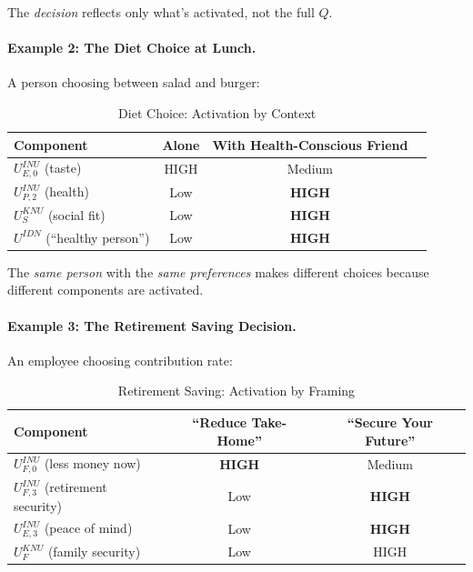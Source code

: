 The \emph{decision} reflects only what's activated, not the full $Q$.

\paragraph{Example 2: The Diet Choice at Lunch.}
A person choosing between salad and burger:

\begin{table}[htbp]
\centering
\caption{Diet Choice: Activation by Context}
\label{tab:diet-choice}
\renewcommand{\arraystretch}{1.3}
\begin{tabular}{@{}lccc@{}}
\toprule
\textbf{Component} & \textbf{Alone} & \textbf{With Health-Conscious Friend} \\
\midrule
$U^{INU}_{E,0}$ (taste) & HIGH & Medium \\
$U^{INU}_{P,2}$ (health) & Low & \textbf{HIGH} \\
$U^{KNU}_{S}$ (social fit) & Low & \textbf{HIGH} \\
$U^{IDN}$ (``healthy person'') & Low & \textbf{HIGH} \\
\bottomrule
\end{tabular}
\end{table}

The \emph{same person} with the \emph{same preferences} makes different choices
because different components are activated.

\paragraph{Example 3: The Retirement Saving Decision.}
An employee choosing contribution rate:

\begin{table}[htbp]
\centering
\caption{Retirement Saving: Activation by Framing}
\label{tab:retirement-framing}
\renewcommand{\arraystretch}{1.3}
\begin{tabular}{@{}lcc@{}}
\toprule
\textbf{Component} & \textbf{``Reduce Take-Home''} & \textbf{``Secure Your Future''} \\
\midrule
$U^{INU}_{F,0}$ (less money now) & \textbf{HIGH} & Medium \\
$U^{INU}_{F,3}$ (retirement security) & Low & \textbf{HIGH} \\
$U^{INU}_{E,3}$ (peace of mind) & Low & \textbf{HIGH} \\
$U^{KNU}_{F}$ (family security) & Low & HIGH \\
\bottomrule
\end{tabular}
\end{table}

